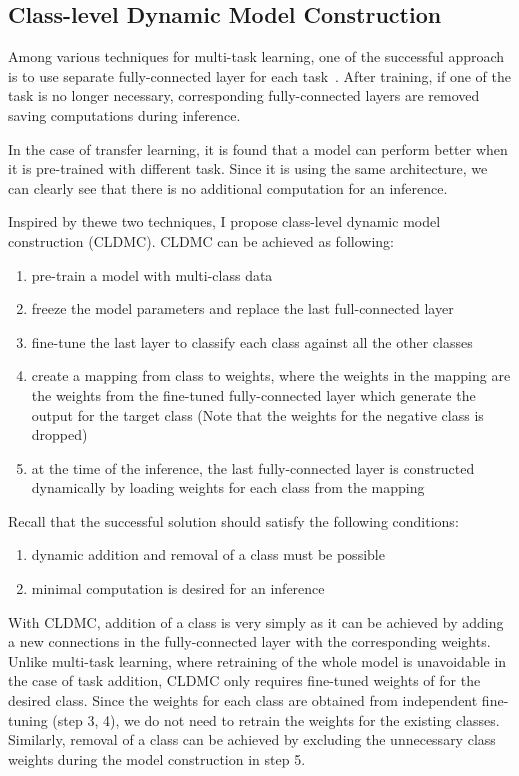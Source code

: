 \documentclass{article}
\begin{document}
\subsection{Class-level Dynamic Model Construction}

Among various techniques for multi-task learning, one of the successful approach is to use separate fully-connected layer for each task~\cite{huang2016mtnet, girshick2015fast, long2017learning}. After training, if one of the task is no longer necessary, corresponding fully-connected layers are removed saving computations during inference.

In the case of transfer learning, it is found that a model can perform better when it is pre-trained with different task. Since it is using the same architecture, we can clearly see that there is no additional computation for an inference.

Inspired by thewe two techniques, I propose class-level dynamic model construction (CLDMC). CLDMC can be achieved as following:

\begin{enumerate}
	\item pre-train a model with multi-class data
	\item freeze the model parameters and replace the last full-connected layer
	\item fine-tune the last layer to classify each class against all the other classes
	\item create a mapping from class to weights, where the weights in the mapping are the weights from the fine-tuned fully-connected layer which generate the output for the target class (Note that the weights for the negative class is dropped)
	\item at the time of the inference, the last fully-connected layer is constructed dynamically by loading weights for each class from the mapping
\end{enumerate}

Recall that the successful solution should satisfy the following conditions:
\begin{enumerate}
	\item dynamic addition and removal of a class must be possible
	\item minimal computation is desired for an inference
\end{enumerate}

With CLDMC, addition of a class is very simply as it can be achieved by adding a new connections in the fully-connected layer with the corresponding weights. Unlike multi-task learning, where retraining of the whole model is unavoidable in the case of task addition, CLDMC only requires fine-tuned weights of for the desired class. Since the weights for each class are obtained from independent fine-tuning (step 3, 4), we do not need to retrain the weights for the existing classes. Similarly, removal of a class can be achieved by excluding the unnecessary class weights during the model construction in step 5.
\end{document}
